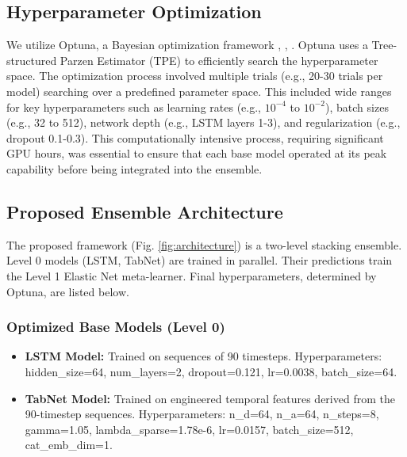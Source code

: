 \documentclass[conference]{IEEEtran}
\begin{document}
\subsection{Hyperparameter Optimization}
We utilize Optuna, a Bayesian optimization framework \cite{b5}, \cite{b16}, \cite{b22}. Optuna uses a Tree-structured Parzen Estimator (TPE) to efficiently search the hyperparameter space. The optimization process involved multiple trials (e.g., 20-30 trials per model) searching over a predefined parameter space. This included wide ranges for key hyperparameters such as learning rates (e.g., $10^{-4}$ to $10^{-2}$), batch sizes (e.g., 32 to 512), network depth (e.g., LSTM layers 1-3), and regularization (e.g., dropout 0.1-0.3). This computationally intensive process, requiring significant GPU hours, was essential to ensure that each base model operated at its peak capability before being integrated into the ensemble.

\subsection{Proposed Ensemble Architecture}
The proposed framework (Fig. \ref{fig:architecture}) is a two-level stacking ensemble. Level 0 models (LSTM, TabNet) are trained in parallel. Their predictions train the Level 1 Elastic Net meta-learner. Final hyperparameters, determined by Optuna, are listed below.

\subsubsection*{Optimized Base Models (Level 0)}
\begin{itemize}
  \item \textbf{LSTM Model:} Trained on sequences of 90 timesteps. Hyperparameters: hidden\_size=64, num\_layers=2, dropout=0.121, lr=0.0038, batch\_size=64.
  \item \textbf{TabNet Model:} Trained on engineered temporal features derived from the 90-timestep sequences. Hyperparameters: n\_d=64, n\_a=64, n\_steps=8, gamma=1.05, lambda\_sparse=1.78e-6, lr=0.0157, batch\_size=512, cat\_emb\_dim=1.
\end{itemize}
\end{document}
